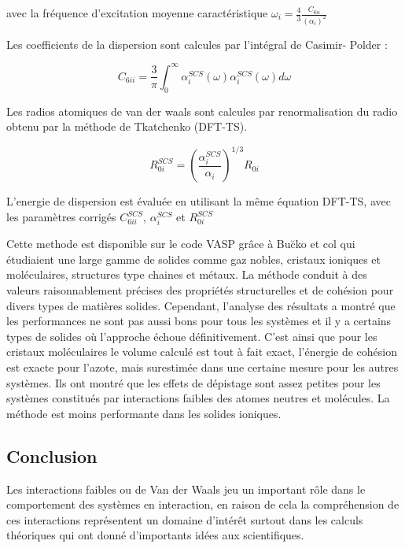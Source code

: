 	avec la fréquence d'excitation moyenne caractéristique $\omega_{i} = \frac{4}{3} \frac{C_{6ii}}{(\alpha_{i})^{2}}$
	\bigskip
	
	Les coefficients de la dispersion sont calcules par l'intégral de Casimir- Polder :
	
	\begin{equation}
	C_{6ii} = \frac{3}{\pi} \int_{0}^{\infty} \alpha_{i}^{SCS} (\omega) \alpha_{i}^{SCS} (\omega) d\omega
	\end{equation}
	
	Les radios atomiques de van der waals sont calcules par renormalisation du radio obtenu par la méthode de Tkatchenko (DFT-TS). 
	
	\begin{equation}
	R_{0i}^{SCS} = \left(\frac{\alpha_{i}^{SCS}}{\alpha_{i}}\right)^{1/3} R_{0i}
	\end{equation}
	
	L'energie de dispersion est évaluée en utilisant la même équation DFT-TS, avec les paramètres corrigés $C_{6ii}^{SCS}$, $\alpha_{i}^{SCS}$ et $R_{0i}^{SCS}$
	
	Cette methode est disponible sur le code VASP grâce à Bu\u{c}ko et col\cite{buvcko2013tkatchenko} qui étudiaient une large gamme de solides comme gaz nobles, cristaux ioniques et moléculaires, structures type chaines et métaux. La méthode conduit à des valeurs raisonnablement précises des propriétés structurelles et de cohésion pour divers types de matières solides. Cependant, l'analyse des résultats a montré que les performances ne sont pas aussi bons pour tous les systèmes et il y a certains types de solides où l'approche échoue définitivement. C'est ainsi que pour les cristaux moléculaires le volume calculé est tout à fait exact, l'énergie de cohésion est exacte pour l'azote, mais surestimée dans une certaine mesure pour les autres systèmes. Ils ont montré que les effets de dépistage sont assez petites pour les systèmes constitués par interactions faibles des atomes neutres et molécules. La méthode est moins performante dans les solides ioniques.
	
	\newpage
	
	\subsection*{Conclusion}
	
	Les interactions faibles ou de Van der Waals jeu un important rôle dans le comportement des systèmes en interaction, en raison de cela la compréhension de ces interactions représentent un domaine d'intérêt surtout dans les calculs théoriques qui ont donné d'importants idées aux scientifiques. 
	\bigskip
	
